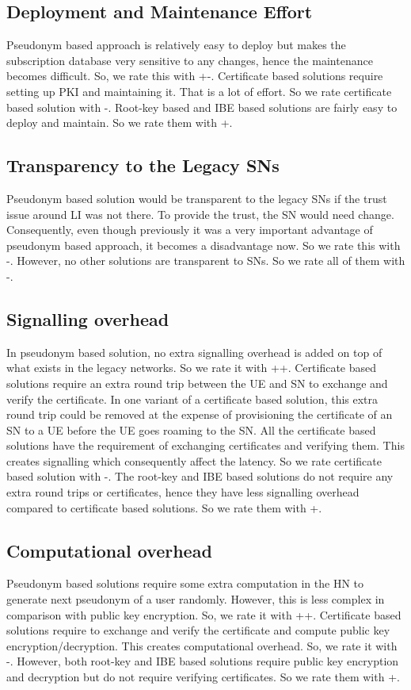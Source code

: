 \documentclass[conference]{IEEEtran}
\begin{document}
\subsection{Deployment and Maintenance Effort}
Pseudonym based approach is relatively easy to deploy but makes the subscription database very sensitive to any changes, hence the maintenance becomes difficult. So, we rate this with +-. Certificate based solutions require setting up PKI and maintaining it. That is a lot of effort. So we rate certificate based solution with -. Root-key based and IBE based solutions are fairly easy to deploy and maintain. So we rate them with +.

\subsection{Transparency to the Legacy SNs}
Pseudonym based solution would be transparent to the legacy SNs if the trust issue around LI was not there. To provide the trust, the SN would need change. Consequently, even though previously it was a very important advantage of pseudonym based approach, it becomes a disadvantage now. So we rate this with -. However, no other solutions are transparent to SNs. So we rate all of them with -.

\subsection{Signalling overhead}
In pseudonym based solution, no extra signalling overhead is added on top of what exists in the legacy networks. So we rate it with ++.
Certificate based solutions require an extra round trip between the UE and SN to exchange and verify the certificate. In one variant of a certificate based solution, this extra round trip could be removed at the expense of provisioning the certificate of an SN to a UE before the UE goes roaming to the SN. All the certificate based solutions have the requirement of exchanging certificates and verifying them. This creates signalling which consequently affect the latency. So we rate certificate based solution with -. The root-key and IBE based solutions do not require any extra round trips or certificates, hence they have less signalling overhead compared to certificate based solutions. So we rate them with +.

\subsection{Computational overhead}
Pseudonym based solutions require some extra computation in the HN to generate next pseudonym of a user randomly. However, this is less complex in comparison with public key encryption. So, we rate it with ++. Certificate based solutions require to exchange and verify the certificate and compute public key encryption/decryption. This creates computational overhead. So, we rate it with -. However, both root-key and IBE based solutions require public key encryption and decryption but do not require verifying certificates. So we rate them with +.
\end{document}
